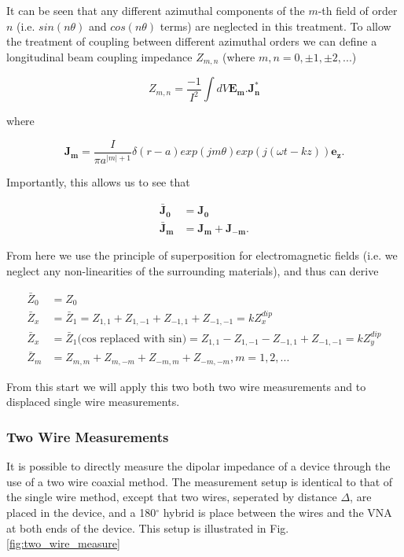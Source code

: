 \documentclass[review, number, sort&compress]{elsarticle}
\begin{document}
It can be seen that any different azimuthal components of the $m$-th field of order $n$ (i.e. $sin \left( n\theta \right)$ and $cos \left( n\theta \right)$ terms) are neglected in this treatment. To allow the treatment of coupling between different azimuthal orders we can define a longitudinal beam coupling impedance $Z_{m,n}$ (where $m,n = 0, \pm 1, \pm 2, ... $)

\begin{equation}
Z_{m,n} = \frac{-1}{I^{2}} \int dV \mathbf{E_{m}. J_{n}^{*}}
\end{equation}

where

\begin{equation}
\mathbf{J_{m}} = \frac{I}{\pi a^{|m |+1}} \delta \left( r - a \right) exp \left(j m \theta \right) exp \left( j \left( \omega t - k z  \right) \right) \mathbf{e_{z}}.
\end{equation}

Importantly, this allows us to see that 

\begin{align}
\mathbf{\bar{J}_{0}} &= \mathbf{J_{0}} \nonumber \\
\mathbf{\bar{J}_{m}} &= \mathbf{J_{m}} + \mathbf{J_{-m}}.
\end{align}

From here we use the principle of superposition for electromagnetic fields (i.e. we neglect any non-linearities of the surrounding materials), and thus can derive

\begin{align}
\bar{Z}_{0} &= Z_{0} \\
\bar{Z}_{x} &= \bar{Z}_{1} = Z_{1,1} + Z_{1,-1} + Z_{-1,1} + Z_{-1,-1} = kZ^{dip}_{x}\\
\bar{Z}_{x} &= \bar{Z}_{1} \text{(cos replaced with sin)}= Z_{1,1} - Z_{1,-1} - Z_{-1,1} + Z_{-1,-1} = kZ^{dip}_{y}\\
\bar{Z}_{m} &= Z_{m,m} + Z_{m,-m} + Z_{-m,m} + Z_{-m,-m}, m=1,2,...
\end{align}

From this start we will apply this two both two wire measurements and to displaced single wire measurements.

\subsubsection{Two Wire Measurements}

It is possible to directly measure the dipolar impedance of a device through the use of a two wire coaxial method. The measurement setup is identical to that of the single wire method, except that two wires, seperated by distance $\Delta$, are placed in the device, and a 180$^{\circ}$ hybrid is place between the wires and the VNA at both ends of the device. This setup is illustrated in Fig. \ref{fig:two_wire_measure}
\end{document}

